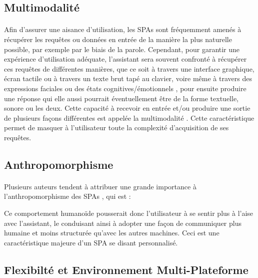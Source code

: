\subsection{Multimodalité}
\paragraph{}
Afin d'assurer une aisance d'utilisation, les SPAs sont fréquemment amenés à récupérer les requêtes ou données en entrée de la manière la plus naturelle possible, par exemple par le biais de la parole. Cependant, pour garantir une expérience d'utilisation adéquate, l'assistant sera souvent confronté à récupérer ces requêtes de différentes manières, que ce soit à travers une interface graphique, écran tactile ou à travers un texte brut tapé au clavier, voire même à travers des expressions faciales ou des états cognitives/émotionnels \citep{Dingler2016}, pour ensuite produire une réponse qui elle aussi pourrait éventuellement être de la forme textuelle, sonore ou les deux. Cette capacité à recevoir en entrée et/ou produire une sortie de plusieurs façons différentes est appelée la multimodalité \citep{Luger2016}. Cette caractéristique permet de masquer à l'utilisateur toute la complexité d'acquisition de ses requêtes.

\subsection{Anthropomorphisme}\label{antropo}
\paragraph{}
Plusieurs auteurs tendent à attribuer une grande importance à l'anthropomorphisme des SPAs \citep{virtualbutler}, qui est :
\begin{quote}
	\citep{alexabff}
\end{quote}

\par Ce comportement humanoïde pousserait donc l'utilisateur à se sentir plus à l'aise avec l'assistant, le conduisant ainsi à adopter une façon de communiquer plus humaine et moins structurée qu'avec les autres machines. Ceci est une caractéristique majeure d'un SPA se disant personnalisé.
\subsection{Flexibilté et Environnement Multi-Plateforme}

